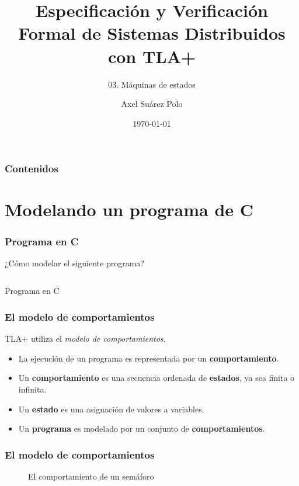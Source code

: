 \documentclass{beamer}
\title{Especificación y Verificación Formal de Sistemas Distribuidos con TLA+}
\subtitle{03. Máquinas de estados}
\author{Axel Suárez Polo}
\institute{BUAP}
\date{\today}
\begin{document}
\begin{frame}
  \titlepage
\end{frame}

\begin{frame}[t]
  \frametitle{Contenidos}
  \tableofcontents
\end{frame}

\section{Modelando un programa de C}

\begin{frame}[fragile]
  \frametitle{Programa en C}

  ¿Cómo modelar el siguiente programa?

  \begin{listing}[H]
    \begin{center}
      \begin{minipage}{0.7\textwidth}
        \inputminted{c}{code/program.c}
      \end{minipage}
    \end{center}
    \caption{Programa en C}
    \label{lst:cprogram_1}
  \end{listing}
\end{frame}

\begin{frame}
  \frametitle{El modelo de comportamientos}

  TLA+ utiliza el \emph{modelo de comportamientos}.

  \begin{itemize}
    \item La ejecución de un programa es representada por un \textbf{comportamiento}.
    \item Un \textbf{comportamiento} es una secuencia ordenada de \textbf{estados}, ya sea finita o infinita.
    \item Un \textbf{estado} es una asignación de valores a variables.

    \item Un \textbf{programa} es modelado por un conjunto de \textbf{comportamientos}.
  \end{itemize}
\end{frame}

\begin{frame}
  \frametitle{El modelo de comportamientos}

  \begin{figure}[h]
      \centering
      
      \caption{El comportamiento de un semáforo}
      \label{fig:sem_behavior}
  \end{figure}

\end{frame}
\end{document}
